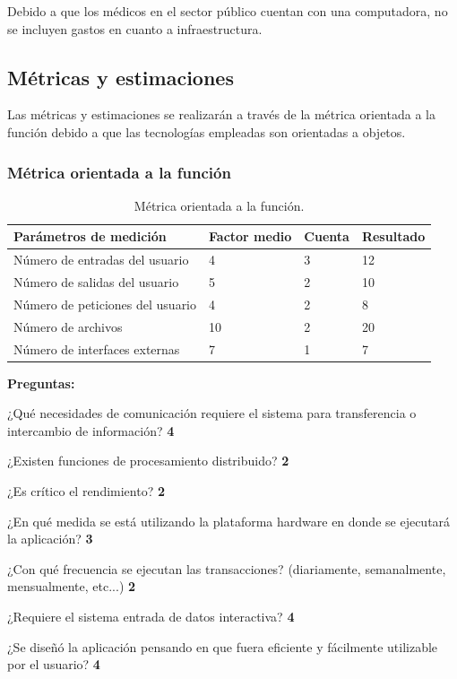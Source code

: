 \documentclass[10pt]{article}
\begin{document}
Debido a que los médicos en el sector público cuentan con una computadora, no se incluyen gastos en cuanto a infraestructura.

\subsection{Métricas y estimaciones}
Las métricas y estimaciones se realizarán a través de la métrica orientada a la función debido a que las tecnologías empleadas son orientadas a objetos.

\subsubsection{Métrica orientada a la función}
\begin{table}[htbp]
\begin{center}
\begin{tabular}{|p{2.2cm}|p{2.2cm}|p{2.2cm}|p{2.2cm}|}
\hline
Parámetros de medición & Factor medio & Cuenta & Resultado  \\
\hline
Número de entradas del usuario &  4 & 3 & 12\\
\hline
Número de salidas del usuario &  5 & 2 & 10\\
\hline
Número de peticiones del usuario &  4 & 2 & 8\\
\hline
Número de archivos &  10 & 2 & 20\\
\hline
Número de interfaces externas &  7 & 1 & 7\\
\hline
\end{tabular}
\caption{Métrica orientada a la función.}
\label{tabla1}
\end{center}
\end{table}
\newpage
\textbf{Preguntas:}

¿Qué necesidades de comunicación requiere el sistema para transferencia o intercambio de información? \textbf{4}

¿Existen funciones de procesamiento distribuido?  \textbf{2}

¿Es crítico el rendimiento?  \textbf{2}

¿En qué medida se está utilizando la plataforma hardware en donde se ejecutará la aplicación? \textbf{3}

¿Con qué frecuencia se ejecutan las transacciones? (diariamente, semanalmente, mensualmente, etc...)  \textbf{2}

¿Requiere el sistema entrada de datos interactiva? \textbf{4}

¿Se diseñó la aplicación pensando en que fuera eficiente y fácilmente utilizable por el usuario?  \textbf{4}
\end{document}
